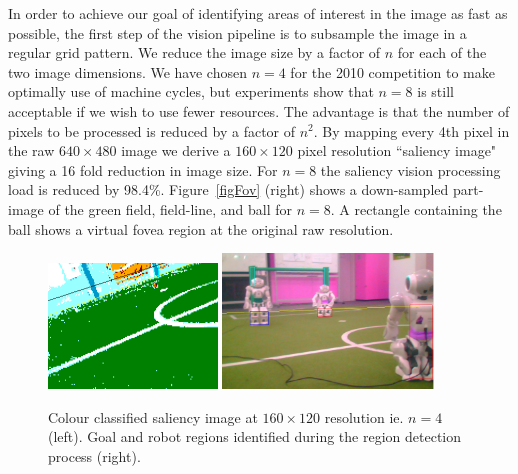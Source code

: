 \documentclass[runningheads,a4paper]{llncs}
\begin{document}
In order to achieve our goal of identifying areas of interest in the image as
fast as possible, the first step of the vision pipeline is to subsample the
image in a regular grid pattern. We reduce the image size by a factor of $n$ for
each of the two image dimensions. We have chosen $n=4$ for the 2010 competition
to make optimally use of machine cycles, but experiments show that $n=8$ is
still acceptable if we wish to use fewer resources. The advantage is that the
number of pixels to be processed is reduced by a factor of $n^2$. By mapping
every 4th pixel in the raw $640 \times 480$ image we derive a $160 \times 120$
pixel resolution ``saliency image" giving a 16 fold reduction in image size. For
$n=8$ the saliency vision processing load is reduced by 98.4\%.
Figure~\ref{figFov} (right) shows a down-sampled part-image of the green field,
field-line, and ball for $n=8$. A rectangle containing the ball shows a virtual
fovea region at the original raw resolution. 

\begin{figure}
\centering
\includegraphics[width=0.4\textwidth]{figures/figSal}
\includegraphics[width=0.5\textwidth]{figures/robotDetectionScreenshot.png}
\caption{Colour classified saliency image at $160 \times 120$ resolution  ie.
$n=4$ (left). Goal and robot regions identified
during the region detection process (right).} \label{figSal}
\end{figure}
\end{document}
